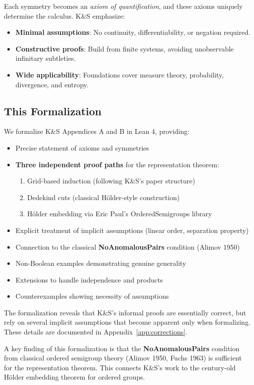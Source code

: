 \documentclass[11pt]{article}
\theoremstyle{definition}
\theoremstyle{remark}
\begin{document}
Each symmetry becomes an \emph{axiom of quantification}, and these axioms uniquely determine the calculus.
K\&S emphasize:
\begin{itemize}
\item \textbf{Minimal assumptions}: No continuity, differentiability, or negation required.
\item \textbf{Constructive proofs}: Build from finite systems, avoiding unobservable infinitary subtleties.
\item \textbf{Wide applicability}: Foundations cover measure theory, probability, divergence, and entropy.
\end{itemize}

\subsection{This Formalization}

We formalize K\&S Appendices A and B in Lean 4, providing:
\begin{itemize}
\item Precise statement of axioms and symmetries
\item \textbf{Three independent proof paths} for the representation theorem:
  \begin{enumerate}
  \item Grid-based induction (following K\&S's paper structure)
  \item Dedekind cuts (classical Hölder-style construction)
  \item H\"older embedding via Eric Paul's OrderedSemigroups library
  \end{enumerate}
\item Explicit treatment of implicit assumptions (linear order, separation property)
\item Connection to the classical \textbf{NoAnomalousPairs} condition (Alimov 1950)
\item Non-Boolean examples demonstrating genuine generality
\item Extensions to handle independence and products
\item Counterexamples showing necessity of assumptions
\end{itemize}

The formalization reveals that K\&S's informal proofs are essentially correct, but rely on several implicit assumptions that become apparent only when formalizing.
These details are documented in Appendix~\ref{app:corrections}.

A key finding of this formalization is that the \textbf{NoAnomalousPairs} condition from classical ordered semigroup theory (Alimov 1950, Fuchs 1963) is sufficient for the representation theorem.
This connects K\&S's work to the century-old H\"older embedding theorem for ordered groups.
\end{document}
